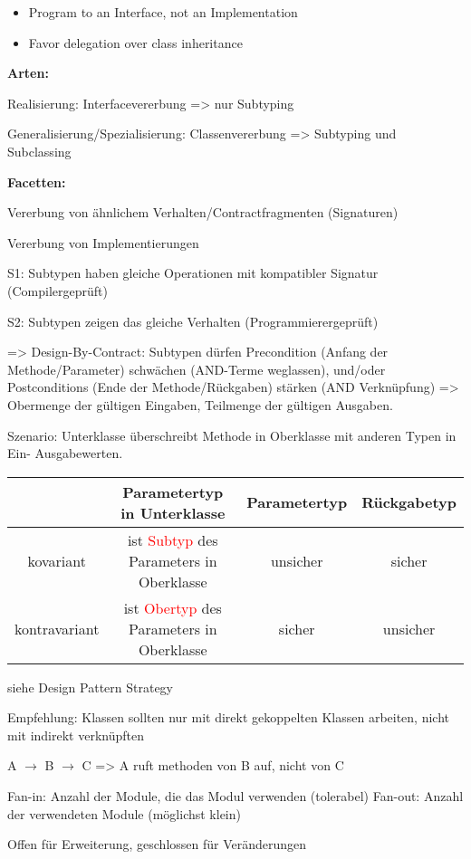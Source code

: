 \begin{itemize}
\item Program to an Interface, not an Implementation
\item Favor delegation over class inheritance
\end{itemize}

\textbf{Arten:}

Realisierung: Interfacevererbung => nur Subtyping

Generalisierung/Spezialisierung: Classenvererbung => Subtyping und Subclassing

\textbf{Facetten:}

 Vererbung von ähnlichem Verhalten/Contractfragmenten (Signaturen) 

 Vererbung von Implementierungen 


S1: Subtypen haben gleiche Operationen mit kompatibler Signatur (Compilergeprüft)

S2: Subtypen zeigen das gleiche Verhalten (Programmierergeprüft)

=> Design-By-Contract: Subtypen dürfen Precondition (Anfang der Methode/Parameter) schwächen (AND-Terme weglassen), und/oder Postconditions (Ende der Methode/Rückgaben) stärken (AND Verknüpfung) => Obermenge der gültigen Eingaben, Teilmenge der gültigen Ausgaben.

Szenario: Unterklasse überschreibt Methode in Oberklasse mit anderen Typen in Ein- Ausgabewerten.

\begin{tabular}{|c|c|c|c|}
\hline	
& Parametertyp in Unterklasse & Parametertyp & Rückgabetyp \\
\hline
kovariant & ist \textcolor{red}{Subtyp} des Parameters in Oberklasse & unsicher & sicher\\
\hline
kontravariant & ist \textcolor{red}{Obertyp} des Parameters in Oberklasse & sicher & unsicher \\
\hline
\end{tabular}


siehe Design Pattern Strategy

Empfehlung: Klassen sollten nur mit direkt gekoppelten Klassen arbeiten, nicht mit indirekt verknüpften

A $\rightarrow$ B $\rightarrow$ C => A ruft methoden von B auf, nicht von C

Fan-in: Anzahl der Module, die das Modul verwenden (tolerabel)
Fan-out: Anzahl der verwendeten Module (möglichst klein)

Offen für Erweiterung, geschlossen für Veränderungen